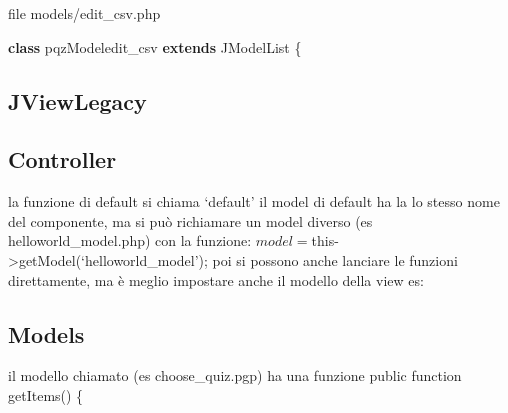 \documentclass[]{article}
\newenvironment{Shaded}{}{}
\newcommand{\KeywordTok}[1]{\textcolor[rgb]{0.00,0.44,0.13}{\textbf{{#1}}}}
\newcommand{\StringTok}[1]{\textcolor[rgb]{0.25,0.44,0.63}{{#1}}}
\newcommand{\CommentTok}[1]{\textcolor[rgb]{0.38,0.63,0.69}{\textit{{#1}}}}
\newcommand{\OtherTok}[1]{\textcolor[rgb]{0.00,0.44,0.13}{{#1}}}
\newcommand{\NormalTok}[1]{{#1}}
\begin{document}
file models/edit\_csv.php

\begin{Shaded}
\begin{Highlighting}[]
\KeywordTok{class} \NormalTok{pqzModeledit_csv }\KeywordTok{extends} \NormalTok{JModelList \{}
\end{Highlighting}
\end{Shaded}

\subsection{JViewLegacy}\label{jviewlegacy}

\begin{Shaded}
\end{Shaded}

\subsection{Controller}\label{controller}

la funzione di default si chiama `default' il model di default ha la lo
stesso nome del componente, ma si può richiamare un model diverso (es
helloworld\_model.php) con la funzione:
$model = $this-\textgreater{}getModel(`helloworld\_model'); poi si
possono anche lanciare le funzioni direttamente, ma è meglio impostare
anche il modello della view es:

\begin{Shaded}
\end{Shaded}

\subsection{Models}\label{models}

il modello chiamato (es choose\_quiz.pgp) ha una funzione public
function getItems() \{
\end{document}

